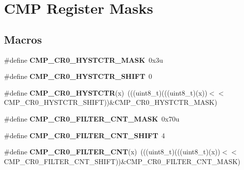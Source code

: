 \hypertarget{group__CMP__Register__Masks}{}\section{C\+MP Register Masks}
\label{group__CMP__Register__Masks}
\subsection*{Macros}
\begin{DoxyCompactItemize}
\item 
\#define {\bfseries C\+M\+P\+\_\+\+C\+R0\+\_\+\+H\+Y\+S\+T\+C\+T\+R\+\_\+\+M\+A\+SK}~0x3u\hypertarget{group__CMP__Register__Masks_ga9a81a95d8ceda15abb107f3c961e2f03}{}\label{group__CMP__Register__Masks_ga9a81a95d8ceda15abb107f3c961e2f03}

\item 
\#define {\bfseries C\+M\+P\+\_\+\+C\+R0\+\_\+\+H\+Y\+S\+T\+C\+T\+R\+\_\+\+S\+H\+I\+FT}~0\hypertarget{group__CMP__Register__Masks_ga12a965eae39b79d9e6066de9af418df3}{}\label{group__CMP__Register__Masks_ga12a965eae39b79d9e6066de9af418df3}

\item 
\#define {\bfseries C\+M\+P\+\_\+\+C\+R0\+\_\+\+H\+Y\+S\+T\+C\+TR}(x)~(((uint8\+\_\+t)(((uint8\+\_\+t)(x))$<$$<$C\+M\+P\+\_\+\+C\+R0\+\_\+\+H\+Y\+S\+T\+C\+T\+R\+\_\+\+S\+H\+I\+FT))\&C\+M\+P\+\_\+\+C\+R0\+\_\+\+H\+Y\+S\+T\+C\+T\+R\+\_\+\+M\+A\+SK)\hypertarget{group__CMP__Register__Masks_ga78eaf28aa2956818501310daaeffca74}{}\label{group__CMP__Register__Masks_ga78eaf28aa2956818501310daaeffca74}

\item 
\#define {\bfseries C\+M\+P\+\_\+\+C\+R0\+\_\+\+F\+I\+L\+T\+E\+R\+\_\+\+C\+N\+T\+\_\+\+M\+A\+SK}~0x70u\hypertarget{group__CMP__Register__Masks_gab1e98c122818fe880217f72fab932ac2}{}\label{group__CMP__Register__Masks_gab1e98c122818fe880217f72fab932ac2}

\item 
\#define {\bfseries C\+M\+P\+\_\+\+C\+R0\+\_\+\+F\+I\+L\+T\+E\+R\+\_\+\+C\+N\+T\+\_\+\+S\+H\+I\+FT}~4\hypertarget{group__CMP__Register__Masks_ga07a4d57ab7d44b55b3d73f612aa7dd98}{}\label{group__CMP__Register__Masks_ga07a4d57ab7d44b55b3d73f612aa7dd98}

\item 
\#define {\bfseries C\+M\+P\+\_\+\+C\+R0\+\_\+\+F\+I\+L\+T\+E\+R\+\_\+\+C\+NT}(x)~(((uint8\+\_\+t)(((uint8\+\_\+t)(x))$<$$<$C\+M\+P\+\_\+\+C\+R0\+\_\+\+F\+I\+L\+T\+E\+R\+\_\+\+C\+N\+T\+\_\+\+S\+H\+I\+FT))\&C\+M\+P\+\_\+\+C\+R0\+\_\+\+F\+I\+L\+T\+E\+R\+\_\+\+C\+N\+T\+\_\+\+M\+A\+SK)\hypertarget{group__CMP__Register__Masks_ga1f6d81f303672acd661263de6da7ea13}{}\label{group__CMP__Register__Masks_ga1f6d81f303672acd661263de6da7ea13}


\end{DoxyCompactItemize}

